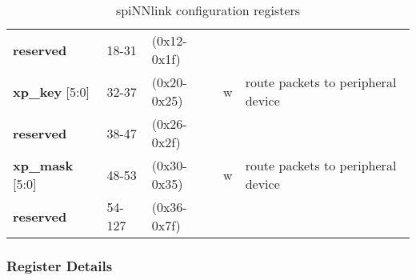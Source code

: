 \documentclass[11pt,a4paper,twoside]{article}
\begin{document}
\begin{center}
\begin{table}[!h]
\begin{tabularx}{\textwidth}{| p{30mm} p{13mm} p{21mm} p{7mm} X |}
			\cellcolor{gray!25}\textbf{reserved} & \cellcolor{gray!25}18-31  & \cellcolor{gray!25} (0x12-0x1f) & \cellcolor{gray!25} & \cellcolor{gray!25}\\%
			\textbf{xp\_key} [5:0]               & 32-37                     & (0x20-0x25)                     & w                   & route packets to peripheral device             \\%
			\cellcolor{gray!25}\textbf{reserved} & \cellcolor{gray!25}38-47  & \cellcolor{gray!25} (0x26-0x2f) & \cellcolor{gray!25} & \cellcolor{gray!25}\\%
			\textbf{xp\_mask} [5:0]              & 48-53                     & (0x30-0x35)                     & w                   & route packets to peripheral device             \\%
			\cellcolor{gray!25}\textbf{reserved} & \cellcolor{gray!25}54-127 & \cellcolor{gray!25} (0x36-0x7f) & \cellcolor{gray!25} & \cellcolor{gray!25}\\%
			\hline
		\end{tabularx}
		\caption{spiNNlink configuration registers}
		\label{tab:spin_regs}
	\end{table}
\end{center}


\subsubsection*{Register Details}
\end{document}
